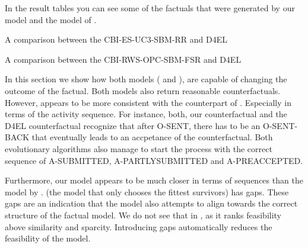 \documentclass[./../../paper.tex]{subfiles}
\begin{document}
In the result tables you can see some of the factuals that were generated by our model and the model of \autocite{hsieh_DiCE4ELInterpretingProcess_2021}.  

\begin{table}
    \centering    
    \resizebox{\linewidth}{!}{
    
    }
    \caption{A comparison between the CBI-ES-UC3-SBM-RR and D4EL}
    \label{fig:exp7-RR}
\end{table}
\begin{table}
    \centering    
    \resizebox{\linewidth}{!}{
    
    }
\caption{A comparison between the CBI-RWS-OPC-SBM-FSR and D4EL}
\label{fig:exp7-FSR}
\end{table}

% 

% 

% 

In this section we show how both models ( and ), are capable of changing the outcome of the factual. Both models also return reasonable counterfactuals. However,  appears to be more consistent with the counterpart of \autocite{hsieh_DiCE4ELInterpretingProcess_2021}. Especially in terms of the activity sequence. For instance, both, our counterfactual and the D4EL counterfactual recognize that after O-SENT, there has to be an O-SENT-BACK that eventually leads to an accpetance of the counterfactual. Both evolutionary algorithms also manage to start the process with the correct sequence of A-SUBMITTED, A-PARTLYSUBMITTED and A-PREACCEPTED. 

Furthermore, our model appears to be much closer in terms of sequences than the model by \citeauthor{hsieh_DiCE4ELInterpretingProcess_2021}.  (the model that only chooses the fittest survivors) has gaps. These gaps are an indication that the model also attempts to align towards the correct structure of the factual model. We do not see that in , as it ranks feasibility above similarity and sparcity. Introducing gaps automatically reduces the feasibility of the model. 


\end{document}
